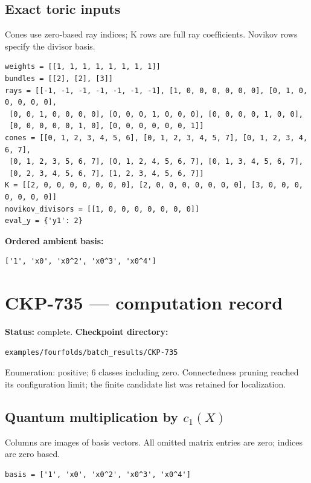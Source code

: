 \documentclass[10pt,a4paper]{article}
\begin{document}
\subsection*{Exact toric inputs}
Cones use zero-based ray indices; K rows are full ray coefficients. Novikov rows specify the divisor basis.

\begin{lstlisting}
weights = [[1, 1, 1, 1, 1, 1, 1, 1]]
bundles = [[2], [2], [3]]
rays = [[-1, -1, -1, -1, -1, -1, -1], [1, 0, 0, 0, 0, 0, 0], [0, 1, 0, 0, 0, 0, 0],
 [0, 0, 1, 0, 0, 0, 0], [0, 0, 0, 1, 0, 0, 0], [0, 0, 0, 0, 1, 0, 0],
 [0, 0, 0, 0, 0, 1, 0], [0, 0, 0, 0, 0, 0, 1]]
cones = [[0, 1, 2, 3, 4, 5, 6], [0, 1, 2, 3, 4, 5, 7], [0, 1, 2, 3, 4, 6, 7],
 [0, 1, 2, 3, 5, 6, 7], [0, 1, 2, 4, 5, 6, 7], [0, 1, 3, 4, 5, 6, 7],
 [0, 2, 3, 4, 5, 6, 7], [1, 2, 3, 4, 5, 6, 7]]
K = [[2, 0, 0, 0, 0, 0, 0, 0], [2, 0, 0, 0, 0, 0, 0, 0], [3, 0, 0, 0, 0, 0, 0, 0]]
novikov_divisors = [[1, 0, 0, 0, 0, 0, 0, 0]]
eval_y = {'y1': 2}
\end{lstlisting}

\textbf{Ordered ambient basis:}
\begin{lstlisting}
['1', 'x0', 'x0^2', 'x0^3', 'x0^4']
\end{lstlisting}

\clearpage\section*{CKP-735 --- computation record}
\textbf{Status:} complete.
\textbf{Checkpoint directory:}
\begin{lstlisting}
examples/fourfolds/batch_results/CKP-735
\end{lstlisting}

Enumeration: positive; 6 classes including zero.
Connectedness pruning reached its configuration limit; the finite candidate list was retained for localization.
\subsection*{Quantum multiplication by $c_1(X)$}
Columns are images of basis vectors. All omitted matrix entries are zero; indices are zero based.

\begin{lstlisting}
basis = ['1', 'x0', 'x0^2', 'x0^3', 'x0^4']
\end{lstlisting}
\end{document}
